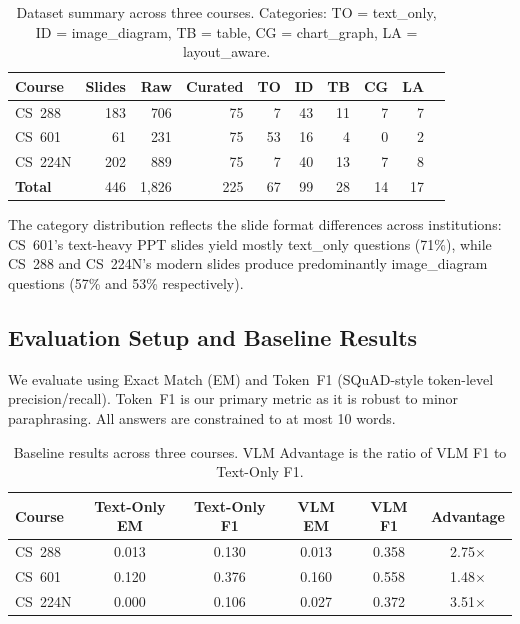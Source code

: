 \documentclass{article} %
\begin{document}
\begin{table}[h]
\caption{Dataset summary across three courses. Categories: TO = text\_only, ID = image\_diagram, TB = table, CG = chart\_graph, LA = layout\_aware.}
\label{tab:dataset}
\begin{center}
\begin{tabular}{lrrrrrrrrr}
\toprule
\textbf{Course} & \textbf{Slides} & \textbf{Raw} & \textbf{Curated} & \textbf{TO} & \textbf{ID} & \textbf{TB} & \textbf{CG} & \textbf{LA} \\
\midrule
CS~288   & 183 &   706 & 75 &  7 & 43 & 11 & 7 & 7 \\
CS~601   &  61 &   231 & 75 & 53 & 16 &  4 & 0 & 2 \\
CS~224N  & 202 &   889 & 75 &  7 & 40 & 13 & 7 & 8 \\
\midrule
\textbf{Total} & 446 & 1{,}826 & 225 & 67 & 99 & 28 & 14 & 17 \\
\bottomrule
\end{tabular}
\end{center}
\end{table}

The category distribution reflects the slide format differences across institutions: CS~601's text-heavy PPT slides yield mostly text\_only questions (71\%), while CS~288 and CS~224N's modern slides produce predominantly image\_diagram questions (57\% and 53\% respectively).

\subsection{Evaluation Setup and Baseline Results}

We evaluate using Exact Match (EM) and Token~F1 (SQuAD-style token-level precision/recall). Token~F1 is our primary metric as it is robust to minor paraphrasing. All answers are constrained to at most 10 words.

\begin{table}[h]
\caption{Baseline results across three courses. VLM Advantage is the ratio of VLM F1 to Text-Only F1.}
\label{tab:results}
\begin{center}
\begin{tabular}{lccccc}
\toprule
\textbf{Course} & \textbf{Text-Only EM} & \textbf{Text-Only F1} & \textbf{VLM EM} & \textbf{VLM F1} & \textbf{Advantage} \\
\midrule
CS~288  & 0.013 & 0.130 & 0.013 & 0.358 & 2.75$\times$ \\
CS~601  & 0.120 & 0.376 & 0.160 & 0.558 & 1.48$\times$ \\
CS~224N & 0.000 & 0.106 & 0.027 & 0.372 & 3.51$\times$ \\
\bottomrule
\end{tabular}
\end{center}
\end{table}
\end{document}
